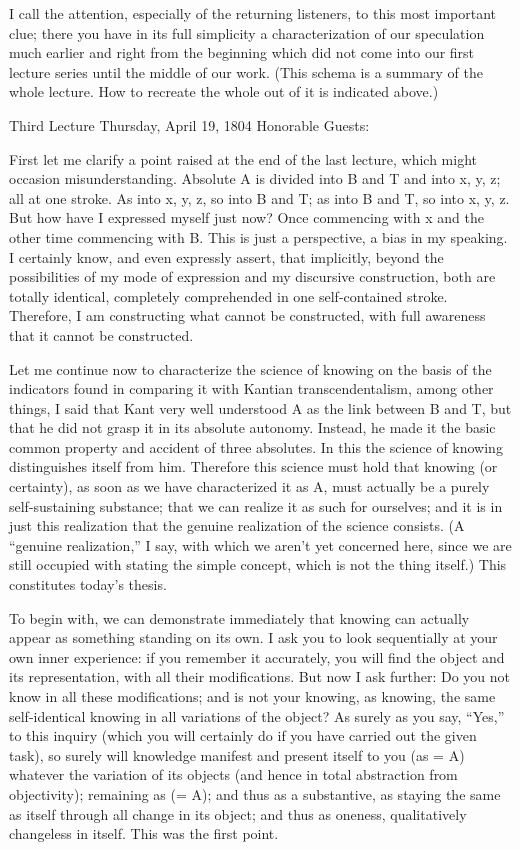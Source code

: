 I call the attention, especially of the returning listeners,
to this most important clue;
there you have in its full simplicity
a characterization of our speculation much earlier
and right from the beginning which did not come into
our first lecture series until the middle of our work.
(This schema is a summary of the whole lecture.
How to recreate the whole out of it is indicated above.)

Third Lecture
Thursday, April 19, 1804
Honorable Guests:

First let me clarify a point raised at the end of the last lecture,
which might occasion misunderstanding.
Absolute A is divided into B and T and into x, y, z; all at one stroke.
As into x, y, z, so into B and T; as into B and T, so into x, y, z.
But how have I expressed myself just now?
Once commencing with x and the other time commencing with B.
This is just a perspective, a bias in my speaking.
I certainly know, and even expressly assert,
that implicitly, beyond the possibilities of
my mode of expression and my discursive construction,
both are totally identical, completely comprehended
in one self-contained stroke.
Therefore, I am constructing what cannot be constructed,
with full awareness that it cannot be constructed.

Let me continue now to characterize the science of knowing
on the basis of the indicators found in comparing it
with Kantian transcendentalism,
among other things, I said that Kant very well understood A as
the link between B and T, but that he did not grasp it
in its absolute autonomy.
Instead, he made it the basic common property and accident of three absolutes.
In this the science of knowing distinguishes itself from him.
Therefore this science must hold that knowing (or certainty),
as soon as we have characterized it as A,
must actually be a purely self-sustaining substance;
that we can realize it as such for ourselves;
and it is in just this realization that the genuine realization
of the science consists.
(A “genuine realization,” I say, with which we aren't yet concerned here,
since we are still occupied with stating the simple concept,
which is not the thing itself.)
This constitutes today's thesis.

To begin with, we can demonstrate immediately that
knowing can actually appear as something standing on its own.
I ask you to look sequentially at your own inner experience:
if you remember it accurately, you will find the object and
its representation, with all their modifications.
But now I ask further:
Do you not know in all these modifications;
and is not your knowing, as knowing,
the same self-identical knowing
in all variations of the object?
As surely as you say, “Yes,” to this inquiry
(which you will certainly do if you have carried out the given task),
so surely will knowledge manifest and present itself to you (as = A)
whatever the variation of its objects
(and hence in total abstraction from objectivity);
remaining as (= A); and thus as a substantive,
as staying the same as itself through all change in its object;
and thus as oneness, qualitatively changeless in itself.
This was the first point.

